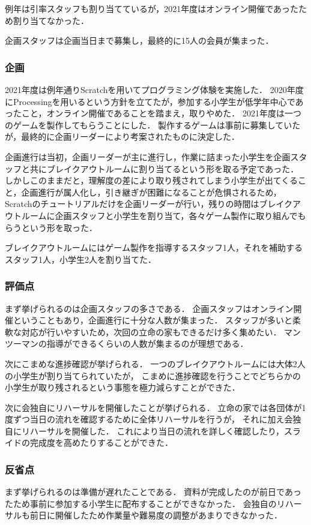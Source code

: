 例年は引率スタッフも割り当てているが，2021年度はオンライン開催であったため割り当てなかった．

企画スタッフは企画当日まで募集し，最終的に15人の会員が集まった．

\subsubsection*{企画}
2021年度は例年通りScratchを用いてプログラミング体験を実施した．
2020年度にProcessingを用いるという方針を立てたが，参加する小学生が低学年中心であったこと，オンライン開催であることを踏まえ，取りやめた．
2021年度は一つのゲームを製作してもらうことにした．
製作するゲームは事前に募集していたが，最終的に企画リーダーにより考案されたものに決定した．

企画進行は当初，企画リーダーが主に進行し，作業に詰まった小学生を企画スタッフと共にブレイクアウトルームに割り当てるという形を取る予定であった．
しかしこのままだと，理解度の差により取り残されてしまう小学生が出てくること，企画進行が属人化し，引き継ぎが困難になることが危惧されるため，
Scratchのチュートリアルだけを企画リーダーが行い，残りの時間はブレイクアウトルームに企画スタッフと小学生を割り当て，各々ゲーム製作に取り組んでもらうという形を取った．

ブレイクアウトルームにはゲーム製作を指導するスタッフ1人，それを補助するスタッフ1人，小学生2人を割り当てた．

\subsubsection*{評価点}
まず挙げられるのは企画スタッフの多さである．
企画スタッフはオンライン開催ということもあり，企画進行に十分な人数が集まった．
スタッフが多いと柔軟な対応が行いやすいため，次回の立命の家もできるだけ多く集めたい．
マンツーマンの指導ができるくらいの人数が集まるのが理想である．

次にこまめな進捗確認が挙げられる．
一つのブレイクアウトルームには大体2人の小学生が割り当てられていたが，
こまめに進捗確認を行うことでどちらかの小学生が取り残されるという事態を極力減らすことができた．

次に会独自にリハーサルを開催したことが挙げられる．
立命の家では各団体が1度ずつ当日の流れを確認するために全体リハーサルを行うが，
それに加え会独自にリハーサルを開催した．
これにより当日の流れを詳しく確認したり，スライドの完成度を高めたりすることができた．

\subsubsection*{反省点}
まず挙げられるのは準備が遅れたことである．
資料が完成したのが前日であったため事前に参加する小学生に配布することができなかった．
会独自のリハーサルも前日に開催したため作業量や難易度の調整があまりできなかった．


